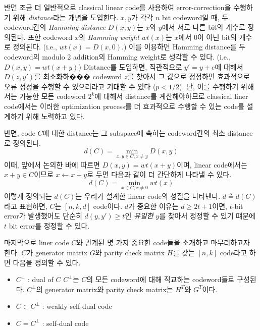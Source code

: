 \vspace{1em}
반면 조금 더 일반적으로 classical linear code를 사용하여 error-correction을 수행하기 위해 \textit{distance}라는 개념을 도입한다. $x, y$가 각각 $n$ bit codeword일 때, 두 codeword간의 \textit{Hamming distance} $D(x, y)$는 $x$와 $y$에서 서로 다른 bit의 개수로 정의된다. 또한 codeword $x$의 \textit{Hamming weight} $wt(x)$는 $x$에서 0이 아닌 bit의 개수로 정의된다. (i.e., $wt(x) = D(x, 0)$.) 이를 이용하면 Hamming distance를 두 codeword의 modulo 2 addition의 Hamming weight로 생각할 수 있다. (i.e., $D(x, y) = wt(x+y)$)
Distance를 도입하면, 직관적으로 $y' = y+e$에 대해서 $D(z, y')$를 최소화하��� codeword $z$를 찾아서 그 값으로 정정하면 효과적으로 오류 정정을 수행할 수 있으리라고 기대할 수 있다 ($p <1/2$). 단, 이를 수행하기 위해서는 가능한 모든 codeword $2^k$에 대해서 distance를 계산해야하므로 classical liner code에서는 이러한 optimization process를 더 효과적으로 수행할 수 있는 code를 설계하기 위해 노력하고 있다.

\vspace{1em}
반면, code $C$에 대한 distance는 그 subspace에 속하는 codeword간의 최소 distance로 정의된다.
\begin{equation*}
    d(C) = \min_{x, y \in C, x \ne y} D(x, y)
\end{equation*}
이때, 앞에서 논의한 바에 따르면 $D(x, y) = wt(x+y)$이며, linear code에서는 $x+y \in C$이므로 $x \leftarrow x+y$로 두면 다음과 같이 더 간단하게 나타낼 수 있다.
\begin{equation*}
    d(C) = \min_{x \in C, x \ne 0} wt(x)
\end{equation*}
이렇게 정의되는 $d(C)$는 우리가 설계한 linear code의 성질을 나타낸다. $d \triangleq d(C)$라고 표현하면, $C$는 $[n, k, d]$ code이다.
$d$가 중요한 이유는 $d \ge 2t+1$이면, $t$-bit error가 발생했어도 단순히 $d(y, y')\ge t$인 \textit{유일한} $y$를 찾아서 정정할 수 있기 떄문에 $t$ bit error를 정정할 수 있다.

\vspace{1em}
마지막으로 liner code $C$와 관계된 몇 가지 중요한 code들을 소개하고 마무리하고자 한다. $C$가 generator matrix $G$와 parity check matrix $H$를 갖는 $[n, k]$ code라고 하면 다음을 정의할 수 있다.
\begin{itemize}
    \item $C^\perp$ : dual of $C$
    $C^\perp$는 $C$의 모든 codeword에 대해 직교하는 codeword들로 구성된다. $C^\perp$의 generator matrix와 parity check matrix는 $H^T$와 $G^T$이다.
    \item $C \subset C^\perp$ : weakly self-dual code
    \item $C = C^\perp$ : self-dual code
\end{itemize}

